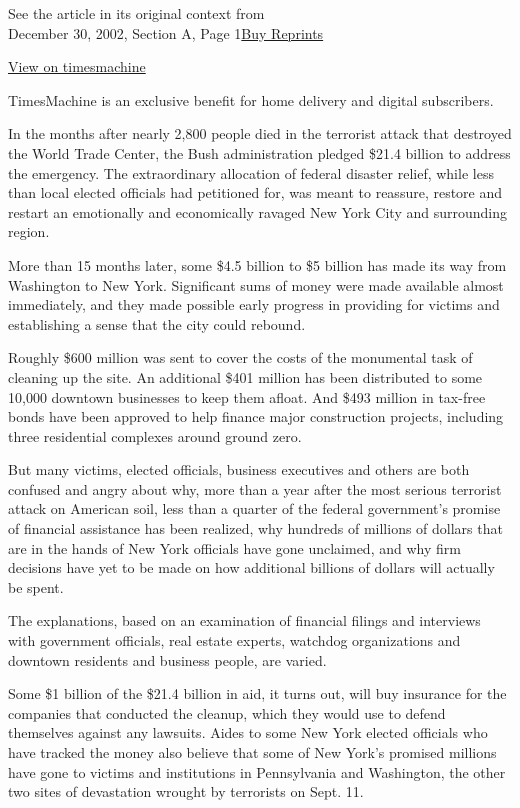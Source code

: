 See the article in its original context from\\
December 30, 2002, Section A, Page
1\href{https://store.nytimes3xbfgragh.onion/collections/new-york-times-page-reprints?utm_source=nytimes\&utm_medium=article-page\&utm_campaign=reprints}{Buy
Reprints}

\href{http://timesmachine.nytimes3xbfgragh.onion/timesmachine/2002/12/30/620904.html}{View
on timesmachine}

TimesMachine is an exclusive benefit for home delivery and digital
subscribers.

In the months after nearly 2,800 people died in the terrorist attack
that destroyed the World Trade Center, the Bush administration pledged
\$21.4 billion to address the emergency. The extraordinary allocation of
federal disaster relief, while less than local elected officials had
petitioned for, was meant to reassure, restore and restart an
emotionally and economically ravaged New York City and surrounding
region.

More than 15 months later, some \$4.5 billion to \$5 billion has made
its way from Washington to New York. Significant sums of money were made
available almost immediately, and they made possible early progress in
providing for victims and establishing a sense that the city could
rebound.

Roughly \$600 million was sent to cover the costs of the monumental task
of cleaning up the site. An additional \$401 million has been
distributed to some 10,000 downtown businesses to keep them afloat. And
\$493 million in tax-free bonds have been approved to help finance major
construction projects, including three residential complexes around
ground zero.

But many victims, elected officials, business executives and others are
both confused and angry about why, more than a year after the most
serious terrorist attack on American soil, less than a quarter of the
federal government's promise of financial assistance has been realized,
why hundreds of millions of dollars that are in the hands of New York
officials have gone unclaimed, and why firm decisions have yet to be
made on how additional billions of dollars will actually be spent.

The explanations, based on an examination of financial filings and
interviews with government officials, real estate experts, watchdog
organizations and downtown residents and business people, are varied.

Some \$1 billion of the \$21.4 billion in aid, it turns out, will buy
insurance for the companies that conducted the cleanup, which they would
use to defend themselves against any lawsuits. Aides to some New York
elected officials who have tracked the money also believe that some of
New York's promised millions have gone to victims and institutions in
Pennsylvania and Washington, the other two sites of devastation wrought
by terrorists on Sept. 11.

